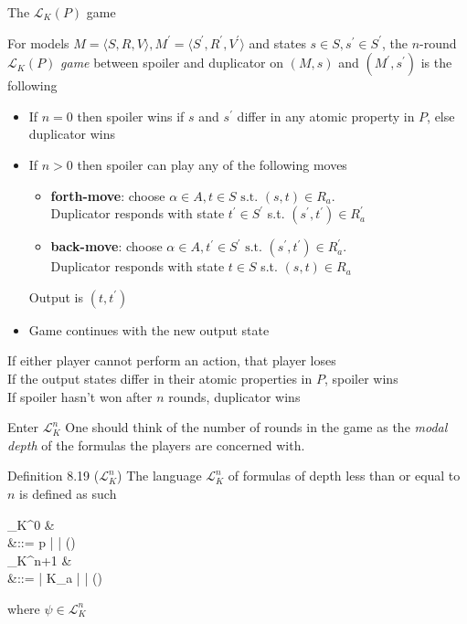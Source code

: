 \documentclass{beamer}
\newcommand{\lang}{\mathcal{L}}
\begin{document}
\begin{frame}{The $\lang_K(P)$ game}
	\begin{small}
	For models $M = \langle S,R,V \rangle, M^\prime = \langle S^\prime,R^\prime,V^\prime \rangle$ and states $s \in S, s^\prime \in S^\prime$, the $n$-round $\lang_K(P)$ \textit{game} between spoiler and duplicator on $(M,s)$ and $(M^\prime,s^\prime)$ is the following \pause
	\begin{itemize}
		\item If $n=0$ then spoiler wins if $s$ and $s^\prime$ differ in any atomic property in $P$, else duplicator wins \pause
		\item If $n>0$ then spoiler can play any of the following moves
			\begin{itemize}
				\item \textbf{forth-move}: choose $\alpha \in A, t \in S \text{ s.t. } (s,t) \in R_a$.\\
				Duplicator responds with state $t^\prime \in S^\prime$ s.t. $(s^\prime,t^\prime) \in R_a^\prime$
				\item \textbf{back-move}: choose $\alpha \in A, t^\prime \in S^\prime \text{ s.t. } (s^\prime,t^\prime) \in R_a^\prime$.\\
				Duplicator responds with state $t \in S$ s.t. $(s,t) \in R_a$
			\end{itemize}
			Output is $(t,t^\prime)$ \pause
		\item Game continues with the new output state
	\end{itemize} \pause
	If either player cannot perform an action, that player loses\\
	If the output states differ in their atomic properties in $P$, spoiler wins\\
	If spoiler hasn't won after $n$ rounds, duplicator wins
	\end{small}
\end{frame}

\begin{frame}{Enter $\lang_K^n$}
	One should think of the number of rounds in the game as the \textit{modal depth} of the formulas the players are concerned with. \pause
	\begin{block}{Definition 8.19 ($\lang_K^n$)}
		The language $\lang_K^n$ of formulas of depth less than or equal to $n$ is defined as such
		\begin{flalign*}
			\lang_K^0 &\\
				&\phi ::= p | \neg \phi | \left(\phi \wedge \phi\right)\\
			\lang_K^{n+1} &\\
				&\phi ::= \psi | K_a \psi | \neg \phi | \left(\phi \wedge \phi\right)
		\end{flalign*}
		where $\psi \in \lang_K^n$
	\end{block}
\end{frame}
\end{document}
